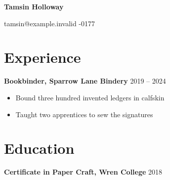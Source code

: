 \documentclass[11pt]{article}
\begin{document}
{\LARGE\bfseries Tamsin Holloway}\par
tamsin@example.invalid -0177\par
\section*{Experience}
\textbf{Bookbinder, Sparrow Lane Bindery} \hfill 2019 -- 2024\par
\begin{itemize}
  \item Bound three hundred invented ledgers in calfskin
  \item Taught two apprentices to sew the signatures
\end{itemize}
\section*{Education}
\textbf{Certificate in Paper Craft, Wren College} \hfill 2018\par
\end{document}
